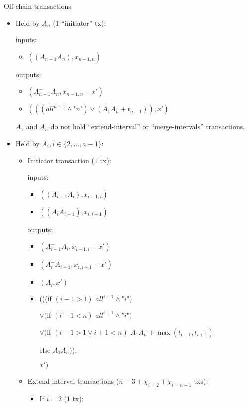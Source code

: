 \begin{notitlebox}{Off-chain transactions}
\begin{itemize}
    \item Held by $A_n$ ($1$ ``initiator'' tx):

    inputs:
    \begin{itemize}
      \item $((A_{n-1} A_n), x_{n-1,n})$
    \end{itemize}
    outputs:
    \begin{itemize}
      \item $(A_{n-1}^- A_n, x_{n-1,n} - x')$
      \item $(((\mathit{all}^{n-1} \wedge \texttt{"}n\texttt{"}) \vee (A_1 A_n +
      t_{n-1})), x')$
    \end{itemize}
    $A_1$ and $A_n$ do not hold ``extend-interval'' or ``merge-intervals''
    transactions.

    \item Held by $A_i, i \in \{2, \dots, n-1\}$:

    \begin{itemize}
      \item Initiator transaction ($1$ tx):

      inputs:
      \begin{itemize}
        \item $((A_{i-1} A_i), x_{i-1,i})$
        \item $((A_i A_{i+1}), x_{i,i+1})$
      \end{itemize}
      outputs:
      \begin{itemize}
        \item $(A_{i-1}^- A_i, x_{i-1,i} - x')$
        \item $(A_i^- A_{i+1}, x_{i,i+1} - x')$
        \item $(A_i, x')$
        \item (((if $(i-1 > 1)$ $\mathit{all}^{i-1} \wedge
        \texttt{"}i\texttt{"})$

        $\vee ($if $(i+1 < n)$ $\mathit{all}^{i+1} \wedge
        \texttt{"}i\texttt{"})$

        $\vee ($if $(i-1 > 1 \vee i+1 < n)$ $A_1 A_n+\max{(t_{i-1}, t_{i+1})}$

        \:\:\: else $A_1 A_n$)),

        $x')$
      \end{itemize}
      \item Extend-interval transactions ($n-3 + \chi_{i=2} + \chi_{i=n-1}$ txs):
      \begin{itemize}
        \item If $i = 2$ ($1$ tx):


\end{itemize}
\end{itemize}
\end{itemize}
\end{notitlebox}
